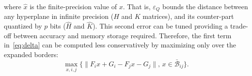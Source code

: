  	where $\hat{x}$ is the finite-precision value of $x$.
 	That is, $\varepsilon_{Q}$ bounds the distance between any hyperplane in infinite
 	precision ($H$ and $K$ matrices), and its counter-part quantized by $p$ bits 
 	($\hat{H}$ and $\hat{K}$).
 	This second error can be tuned providing a trade-off between accuracy and
 	memory storage required.
 	Therefore, the first term in~\autoref{eq:delta} can be computed less conservatively by maximizing only over 
 	the expanded borders:
 	\begin{equation}
 	\label{eq:maximization}
 	\max_{x,i,j}\{\|F_ix+G_i-F_jx-G_j\|,\,x\in \bar{\mathcal B}_{ij}\}.
 	\end{equation}
 


